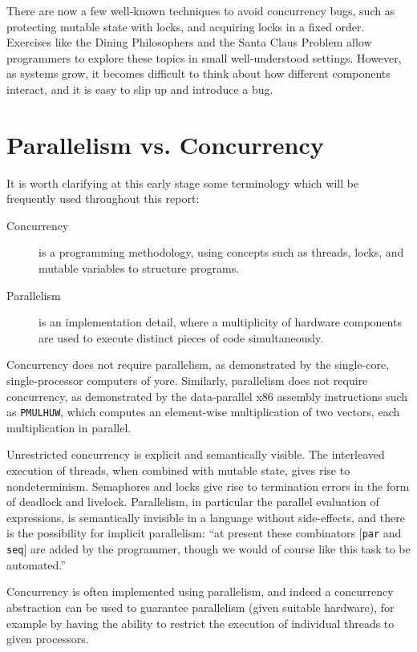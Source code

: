 There are now a few well-known techniques to avoid concurrency bugs,
such as protecting mutable state with locks, and acquiring locks in a
fixed order. Exercises like the Dining
Philosophers\cite{diningphilosophers} and the Santa Claus
Problem\cite{santaclaus} allow programmers to explore these topics in
small well-understood settings. However, as systems grow, it becomes
difficult to think about how different components interact, and it is
easy to slip up and introduce a bug.

\section{Parallelism vs. Concurrency}
\label{sec:intro-parconc}

It is worth clarifying at this early stage some terminology which will
be frequently used throughout this report:

\begin{description}
  \item[Concurrency] is a programming methodology, using concepts such
    as threads, locks, and mutable variables to structure
    programs.

  \item[Parallelism] is an implementation detail, where a multiplicity
    of hardware components are used to execute distinct pieces of code
    simultaneously.
\end{description}

Concurrency does not require parallelism, as demonstrated by the
single-core, single-processor computers of yore. Similarly,
parallelism does not require concurrency, as demonstrated by the
data-parallel x86 assembly instructions such as \verb|PMULHUW|, which
computes an element-wise multiplication of two vectors, each
multiplication in parallel.

Unrestricted concurrency is explicit and semantically
visible\cite{concurrent}. The interleaved execution of threads, when
combined with mutable state, gives rise to nondeterminism. Semaphores
and locks give rise to termination errors in the form of deadlock and
livelock. Parallelism, in particular the parallel evaluation of
expressions, is semantically invisible in a language without
side-effects, and there is the possibility for implicit parallelism:
``at present these combinators [\verb|par| and \verb|seq|] are added
by the programmer, though we would of course like this task to be
automated.''\cite{gum}

Concurrency is often implemented using parallelism, and indeed a
concurrency abstraction can be used to guarantee parallelism (given
suitable hardware), for example by having the ability to restrict the
execution of individual threads to given processors.

